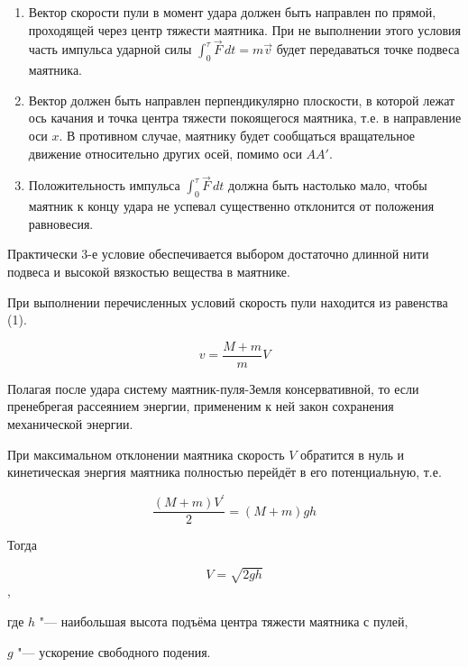 \begin{enumerate}
        \item Вектор скорости пули в момент удара должен быть направлен по прямой,
        проходящей через центр тяжести маятника.
        При не выполнении этого условия часть импульса ударной силы
        $\int_{0}^{\tau } \vec{F} \,dt=m\vec{v}$ 
        будет передаваться точке подвеса маятника.

        \item Вектор должен быть направлен перпендикулярно плоскости,
        в которой лежат ось качания и точка центра тяжести покоящегося маятника,
        т.е. в направление оси $x$.
        В противном случае, маятнику будет сообщаться вращательное движение относительно других осей, помимо оси $AA'$.

        \item Положительность импульса
        $\int_{0}^{\tau } \vec{F} \,dt$
        должна быть настолько мало,
        чтобы маятник к концу удара не успевал существенно отклонится от положения равновесия.
\end{enumerate}

Практически 3-е условие обеспечивается выбором достаточно длинной нити подвеса и высокой вязкостью вещества в маятнике.

При выполнении перечисленных условий скорость пули находится из равенства (1).

\begin{equation}
        v=\frac{M+m}{m}V 
\end{equation}

Полагая после удара систему маятник-пуля-Земля консервативной,
то если пренебрегая рассеянием энергии,
примененим к ней закон сохранения механической энергии.

При максимальном отклонении маятника скорость $V$ обратится в нуль и кинетическая энергия маятника полностью перейдёт в его потенциальную, т.е.
        
\begin{equation}
        \frac{(M+m)V^\prime}{2}=(M+m)gh
\end{equation}

Тогда

\begin{equation} 
        V=\sqrt{2gh}
\end{equation},

где $ h $ "--- наибольшая высота подъёма центра тяжести маятника с пулей,

$ g $ "--- ускорение свободного подения.

